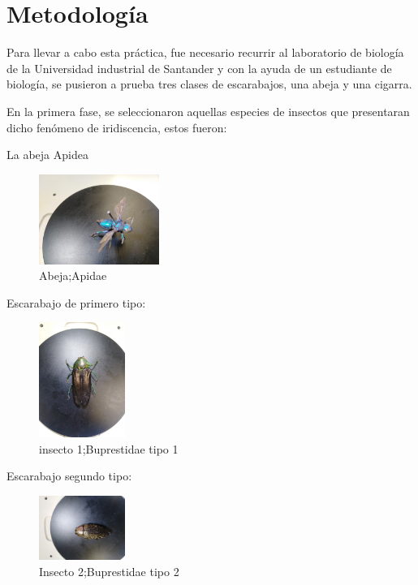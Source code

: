 \documentclass[a4paper, twocolumn, 10pt]{article}
\begin{document}
\section{Metodología}

\noindent Para llevar a cabo esta práctica, fue necesario recurrir al laboratorio de biología de la Universidad industrial de Santander y con la ayuda de un estudiante de biología, se pusieron a prueba tres clases de escarabajos, una abeja y una cigarra.

\noindent En la primera fase, se seleccionaron aquellas especies de insectos que presentaran dicho fenómeno de iridiscencia, estos fueron: 

\noindent La abeja Apidea

\begin{figure}[H]
    \centering
    \includegraphics[width = 0.35\textwidth]{abeja.jpg}
    \caption{Abeja;Apidae}
    \label{tipos}
\end{figure}

\noindent Escarabajo de primero tipo:



\begin{figure}[H]
    \centering
    \includegraphics[width = 0.25\textwidth]{insecto1.jpg}
    \caption{insecto 1;Buprestidae tipo 1}
    \label{tipos}
\end{figure}

\noindent Escarabajo segundo tipo:


\begin{figure}[H]
    \centering
    \includegraphics[width = 0.25\textwidth]{insecto2.jpg}
    \caption{Insecto 2;Buprestidae tipo 2}
    \label{tipos}
\end{figure}
\end{document}
